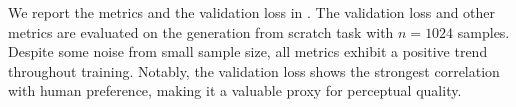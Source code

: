 

We report the metrics and the validation loss in . The validation loss and other metrics are evaluated on the generation from scratch task with $n=1024$ samples. Despite some noise from small sample size, all metrics exhibit a positive trend throughout training. Notably, the validation loss shows the strongest correlation with human preference, making it a valuable proxy for perceptual quality.
